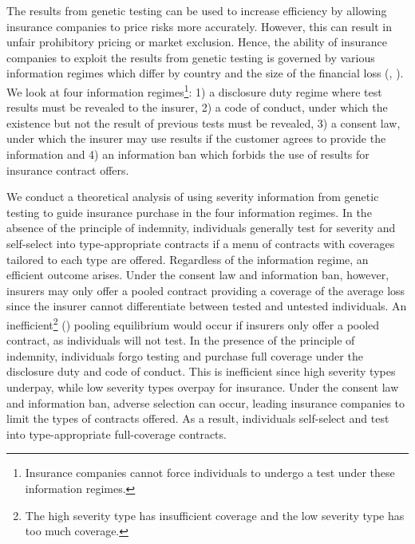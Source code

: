 \documentclass[nonatbib,preprint,12pt]{elsarticle}
\theoremstyle{plain}
\theoremstyle{definition}
\theoremstyle{plain}
\theoremstyle{TheoremNum}
\theoremstyle{CorollaryNum}
\theoremstyle{PropositionNum}
\theoremstyle{TheoremNum}
\begin{document}
The results from genetic testing can be used to increase efficiency by allowing insurance companies to price risks more accurately. However, this can result in unfair prohibitory pricing or market exclusion. Hence, the ability of insurance companies to exploit the results from genetic testing is governed by various information regimes which differ by country and the size of the financial loss (\citeauthor{belisle2019genetic}, \citeyear{belisle2019genetic}). We look at four information regimes\footnote{Insurance companies cannot force individuals to undergo a test under these information regimes.}: 1) a disclosure duty regime where test results must be revealed to the insurer, 2) a code of conduct, under which the existence but not the result of previous tests must be revealed, 3) a consent law, under which the insurer may use results if the customer agrees to provide the information and 4) an information ban which forbids the use of results for insurance contract offers. 

We conduct a theoretical analysis of using severity information from genetic testing to guide insurance purchase in the four information regimes. In the absence of the principle of indemnity, individuals generally test for severity and self-select into type-appropriate contracts if a menu of contracts with coverages tailored to each type are offered. Regardless of the information regime, an efficient outcome arises. Under the consent law and information ban, however, insurers may only offer a pooled contract providing a coverage of the average loss since the insurer cannot differentiate between tested and untested individuals. An inefficient\footnote{The high severity type has insufficient coverage and the low severity type has too much coverage.} \citeauthor{rothschild1978equilibrium} (\citeyear{rothschild1978equilibrium}) pooling equilibrium would occur if insurers only offer a pooled contract, as individuals will not test. In the presence of the principle of indemnity, individuals forgo testing and purchase full coverage under the disclosure duty and code of conduct. This is inefficient since high severity types underpay, while low severity types overpay for insurance. Under the consent law and information ban, adverse selection can occur, leading insurance companies to limit the types of contracts offered. As a result, individuals self-select and test into type-appropriate full-coverage contracts. 
\end{document}

